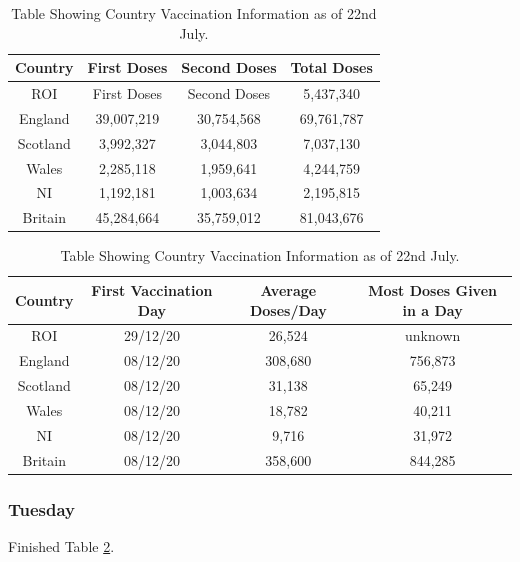 \documentclass[a4paper,11pt]{article}
\theoremstyle{plain}
\theoremstyle{definition}
\begin{document}
\begin{table}[hbtp]
		\begin{center}
			\caption{Table Showing Country Vaccination Information as of 22nd July.}
			\begin{tabular}{ c|c|c|c }
				Country & First Doses & Second Doses & Total Doses \\ 
	        	\hline
		        \hline
		        ROI & First Doses & Second Doses & 5,437,340 \\ 
		        \hline
		        England & 39,007,219 & 30,754,568 & 69,761,787\\ 
		        \hline
		        Scotland & 3,992,327 & 3,044,803 & 7,037,130 \\ 
		        \hline
		        Wales & 2,285,118 & 1,959,641 & 4,244,759 \\ 
		        \hline
		        NI & 1,192,181 & 1,003,634 & 2,195,815 \\ 
		        \hline
		        Britain & 45,284,664 & 35,759,012 & 81,043,676 \\ 
			\end{tabular}
			
			\begin{tabular}{ c|c|c|c }
				Country & First Vaccination Day & Average Doses/Day & Most Doses Given in a Day \\ 
	        	\hline
		        \hline
		        ROI & 29/12/20 & 26,524 & unknown\\ 
		        \hline
		        England & 08/12/20 &  308,680 & 756,873\\ 
		        \hline
		        Scotland & 08/12/20 &  31,138 & 65,249\\ 
		        \hline
		        Wales & 08/12/20 &  18,782 & 40,211\\ 
		        \hline
		        NI & 08/12/20 & 9,716 & 31,972 \\ 
		        \hline
		        Britain & 08/12/20 & 358,600 & 844,285 \\ 
			\end{tabular}
			\label{tab:L}
		\end{center}
\end{table}

\subsubsection{Tuesday}

Finished Table \ref{tab:L}.


\end{document}

